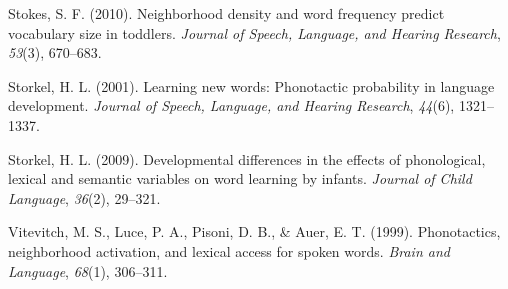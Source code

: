 \documentclass[10pt, letterpaper]{article}
\begin{document}
\hypertarget{ref-stokes2010}{}
Stokes, S. F. (2010). Neighborhood density and word frequency predict
vocabulary size in toddlers. \emph{Journal of Speech, Language, and
Hearing Research}, \emph{53}(3), 670--683.

\hypertarget{ref-storkel2001}{}
Storkel, H. L. (2001). Learning new words: Phonotactic probability in
language development. \emph{Journal of Speech, Language, and Hearing
Research}, \emph{44}(6), 1321--1337.

\hypertarget{ref-storkel2009}{}
Storkel, H. L. (2009). Developmental differences in the effects of
phonological, lexical and semantic variables on word learning by
infants. \emph{Journal of Child Language}, \emph{36}(2), 29--321.

\hypertarget{ref-vitevitch1999}{}
Vitevitch, M. S., Luce, P. A., Pisoni, D. B., \& Auer, E. T. (1999).
Phonotactics, neighborhood activation, and lexical access for spoken
words. \emph{Brain and Language}, \emph{68}(1), 306--311.
\end{document}
